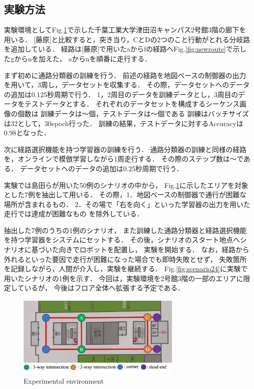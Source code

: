 \documentclass{sice-si}
\begin{document}
\subsection{実験方法}
実験環境としてFig.\ref{fig:cit3f}で示した千葉工業大学津田沼キャンパス2号館3階の廊下を用いる．
[藤原]と比較すると，突き当り，CとDの2つのこと行動がとれる分岐路を追加している．
経路は[藤原]で用いたaからfの経路へFig.\ref{fig:newroute}で示したgからnを加えた，
aからnを順番に走行する．\par
まず初めに通路分類器の訓練を行う．
前述の経路を地図ベースの制御器の出力を用いて，3周し，データセットを収集する．
その際，データセットへのデータの追加は0.125秒周期で行う．
1，2周目のデータを訓練データとし，3周目のデータをテストデータとする．
それぞれのデータセットを構成するシーケンス画像の個数は
訓練データは〜個，テストデータは〜個である
訓練はバッチサイズは32として，30epoch行った．
訓練の結果，テストデータに対するAccuracyは0.98となった．\par
次に経路選択機能を持つ学習器の訓練を行う．
通路分類器の訓練と同様の経路を，オンラインで模倣学習しながら1周走行する．
その際のステップ数は〜である．
データセットへのデータの追加は0.25秒周期で行う．\par
実験では島田らが用いた50例のシナリオの中から，
Fig.\ref{fig:cit3f}に示したエリアを対象とした7例を抽出して用いる．
その際，1．地図ベースの制御器で通行が困難な場所が含まれるもの．
2．その場で「右を向く」といった学習器の出力を用いた走行では達成が困難なもの
を除外している．\par
抽出した7例のうちの1例のシナリオ，
また訓練した通路分類器と経路選択機能を持つ学習器をシステムにセットする．
その後，シナリオのスタート地点へシナリオに基づいた向きでロボットを配置し，
実験を開始する．
なお，経路から外れるといった要因で走行が困難になった場合でも即時失敗とせず，
失敗箇所を記録しながら，人間が介入し，実験を継続する．
Fig.\ref{fig:scenario24}に実験で用いたシナリオの1例を示す．
今回は，実験環境を2号館3階の一部のエリアに限定しているが，
今後はフロア全体へ拡張する予定である．
\begin{figure}[htbp]
    \centering
     \includegraphics[height=40mm,width=80mm]{./figs/keiro.png}
     \caption{Experimental environment}\label{fig:cit3f}
\end{figure}
\end{document}
